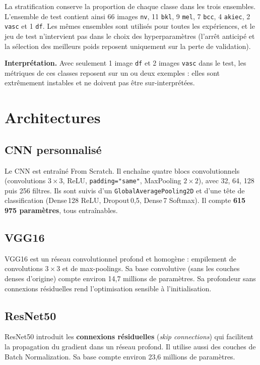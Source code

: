 \documentclass[12pt,a4paper]{article}
\begin{document}
La stratification conserve la proportion de chaque classe dans les trois ensembles. L'ensemble de test contient ainsi 66 images \texttt{nv}, 11 \texttt{bkl}, 9 \texttt{mel}, 7 \texttt{bcc}, 4 \texttt{akiec}, 2 \texttt{vasc} et 1 \texttt{df}. Les mêmes ensembles sont utilisés pour toutes les expériences, et le jeu de test n'intervient pas dans le choix des hyperparamètres (l'arrêt anticipé et la sélection des meilleurs poids reposent uniquement sur la perte de validation).

\textbf{Interprétation.} Avec seulement 1 image \texttt{df} et 2 images \texttt{vasc} dans le test, les métriques de ces classes reposent sur un ou deux exemples : elles sont extrêmement instables et ne doivent pas être sur-interprétées.

\section{Architectures}
\subsection{CNN personnalisé}
Le CNN est entraîné From Scratch. Il enchaîne quatre blocs convolutionnels (convolutions $3\times3$, ReLU, \texttt{padding="same"}, MaxPooling $2\times2$), avec 32, 64, 128 puis 256 filtres. Ils sont suivis d'un \texttt{GlobalAveragePooling2D} et d'une tête de classification (Dense\,128 ReLU, Dropout\,0,5, Dense\,7 Softmax). Il compte \textbf{615\,975 paramètres}, tous entraînables.

\subsection{VGG16}
VGG16 est un réseau convolutionnel profond et homogène : empilement de convolutions $3\times3$ et de max-poolings. Sa base convolutive (sans les couches denses d'origine) compte environ 14,7 millions de paramètres. Sa profondeur sans connexions résiduelles rend l'optimisation sensible à l'initialisation.

\subsection{ResNet50}
ResNet50 introduit les \textbf{connexions résiduelles} (\textit{skip connections}) qui facilitent la propagation du gradient dans un réseau profond. Il utilise aussi des couches de Batch Normalization. Sa base compte environ 23,6 millions de paramètres.
\end{document}
